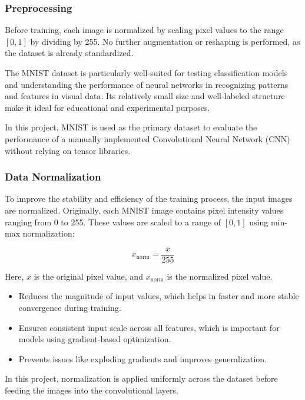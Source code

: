 \documentclass[conference]{IEEEtran}
\begin{document}
\subsubsection{Preprocessing}

Before training, each image is normalized by scaling pixel values to the range $[0, 1]$ by dividing by 255. No further augmentation or reshaping is performed, as the dataset is already standardized.

The MNIST dataset is particularly well-suited for testing classification models and understanding the performance of neural networks in recognizing patterns and features in visual data. Its relatively small size and well-labeled structure make it ideal for educational and experimental purposes.

In this project, MNIST is used as the primary dataset to evaluate the performance of a manually implemented Convolutional Neural Network (CNN) without relying on tensor libraries.

\subsubsection{Data Normalization}

To improve the stability and efficiency of the training process, the input images are normalized. Originally, each MNIST image contains pixel intensity values ranging from 0 to 255. These values are scaled to a range of $[0, 1]$ using min-max normalization:

\begin{equation}
x_{\text{norm}} = \frac{x}{255}
\end{equation}

Here, $x$ is the original pixel value, and $x_{\text{norm}}$ is the normalized pixel value.

\begin{itemize}
    \item Reduces the magnitude of input values, which helps in faster and more stable convergence during training.
    \item Ensures consistent input scale across all features, which is important for models using gradient-based optimization.
    \item Prevents issues like exploding gradients and improves generalization.
\end{itemize}

In this project, normalization is applied uniformly across the dataset before feeding the images into the convolutional layers.
\end{document}
